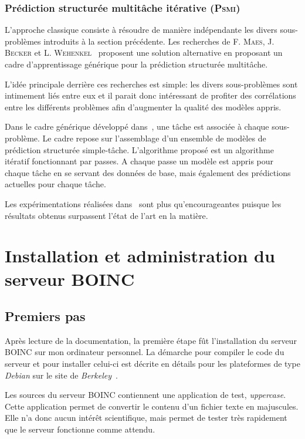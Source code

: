 \documentclass[a4paper, 11pt]{report}
\begin{document}
\subsection{Prédiction structurée multitâche itérative (\textsc{Psmi})}
\label{psmi}
L'approche classique consiste à résoudre de manière indépendante les divers sous-problèmes introduits à la section précédente. Les recherches de F. \textsc{Maes}, J. \textsc{Becker} et L. \textsc{Wehenkel}~\cite{CAP} proposent une solution alternative en proposant un cadre d'apprentissage générique pour la prédiction structurée multitâche. 

L'idée principale derrière ces recherches est simple: les divers sous-problèmes sont intimement liés entre eux et il parait donc intéressant de profiter des corrélations entre les différents problèmes afin d'augmenter la qualité des modèles appris. 

Dans le cadre générique développé dans~\cite{CAP}, une tâche est associée à chaque sous-problème. Le cadre repose sur l'assemblage d'un ensemble de modèles de prédiction structurée simple-tâche. L'algorithme proposé est un algorithme itératif fonctionnant par passes. A chaque passe un modèle est appris pour chaque tâche en se servant des données de base, mais également des prédictions actuelles pour chaque tâche.

Les expérimentations réalisées dans~\cite{CAP} sont plus qu'encourageantes puisque les résultats obtenus surpassent l'état de l'art en la matière.

\chapter{Installation et administration du serveur \textsc{BOINC}}
\section{Premiers pas}
Après lecture de la documentation, la première étape fût l'installation du serveur \textsc{BOINC} sur mon ordinateur personnel. La démarche pour compiler le code du serveur et pour installer celui-ci est décrite en détails pour les plateformes de type \textit{Debian} sur le site de \textit{Berkeley}~\cite{BOINC}.

Les sources du serveur \textsc{BOINC} contiennent une application de test, \textit{uppercase}. Cette application permet de convertir le contenu d'un fichier texte en majuscules. Elle n'a donc aucun intérêt scientifique, mais permet de tester très rapidement que le serveur fonctionne comme attendu.
\end{document}
